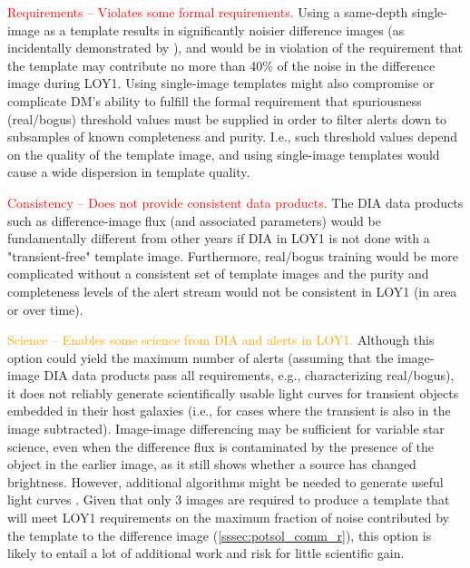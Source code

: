 \documentclass[DM,lsstdraft,toc]{lsstdoc}
\begin{document}
\textcolor{red}{ Requirements -- Violates some formal requirements.}
Using a same-depth single-image as a template results in significantly noisier difference images (as incidentally demonstrated by ), and would be in violation of the requirement that the template may contribute no more than 40\% of the noise in the difference image during LOY1.
Using single-image templates might also compromise or complicate DM's ability to fulfill the formal requirement that spuriousness (real/bogus) threshold values must be supplied in order to filter alerts down to subsamples of known completeness and purity.
I.e., such threshold values depend on the quality of the template image, and using single-image templates would cause a wide dispersion in template quality.

\textcolor{red}{ Consistency -- Does not provide consistent data products.}
The DIA data products such as difference-image flux (and associated parameters) would be fundamentally different from other years if DIA in LOY1 is not done with a "transient-free" template image.
Furthermore, real/bogus training would be more complicated without a consistent set of template images and the purity and completeness levels of the alert stream would not be consistent in LOY1 (in area or over time).

\textcolor{orange}{ Science -- Enables some science from DIA and alerts in LOY1.}
Although this option could yield the maximum number of alerts (assuming that the image-image DIA data products pass all requirements, e.g., characterizing real/bogus), it does not reliably generate scientifically usable light curves for transient objects embedded in their host galaxies (i.e., for cases where the transient is also in the image subtracted).
Image-image differencing may be sufficient for variable star science, even when the difference flux is contaminated by the presence of the object in the earlier image, as it still shows whether a source has changed brightness.
However, additional algorithms might be needed to generate useful light curves \citep[e.g.,][]{2005AJ....130.2272B}.
Given that only 3 images are required to produce a template that will meet LOY1 requirements on the maximum fraction of noise contributed by the template to the difference image (\ref{sssec:potsol_comm_r}), this option is likely to entail  a lot of additional work and risk for little scientific gain.
\end{document}
